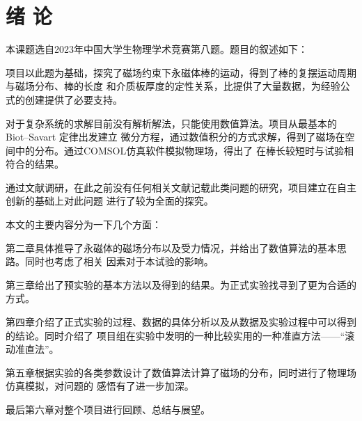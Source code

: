 \documentclass[AutoFakeBold]{LZUThesis}
\begin{document}
\mainmatter

\chapter{\texorpdfstring{绪 \quad 论}{绪论}}
本课题选自2023年中国大学生物理学术竞赛第八题。题目的叙述如下：
\begin{center}
\end{center}
项目以此题为基础，探究了磁场约束下永磁体棒的运动，得到了棒的复摆运动周期与磁场分布、棒的长度
和介质板厚度的定性关系，比提供了大量数据，为经验公式的创建提供了必要支持。

对于复杂系统的求解目前没有解析解法，只能使用数值算法。项目从最基本的Biot–Savart 定律出发建立
微分方程，通过数值积分的方式求解，得到了磁场在空间中的分布。通过COMSOL仿真软件模拟物理场，得出了
在棒长较短时与试验相符合的结果。

通过文献调研，在此之前没有任何相关文献记载此类问题的研究，项目建立在自主创新的基础上对此问题
进行了较为全面的探究。

本文的主要内容分为一下几个方面：

第二章具体推导了永磁体的磁场分布以及受力情况，并给出了数值算法的基本思路。同时也考虑了相关
因素对于本试验的影响。

第三章给出了预实验的基本方法以及得到的结果。为正式实验找寻到了更为合适的方式。

第四章介绍了正式实验的过程、数据的具体分析以及从数据及实验过程中可以得到的结论。同时介绍了
项目组在实验中发明的一种比较实用的一种准直方法——“滚动准直法”。

第五章根据实验的各类参数设计了数值算法计算了磁场的分布，同时进行了物理场仿真模拟，对问题的
感悟有了进一步加深。

最后第六章对整个项目进行回顾、总结与展望。
\end{document}
